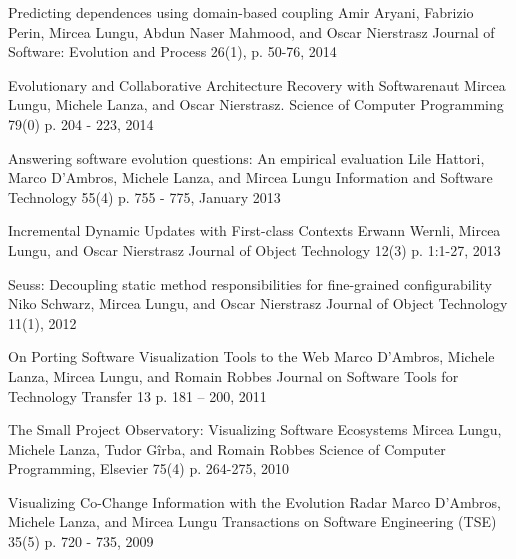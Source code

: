 
\begin{enumerate}

\paper
	{Predicting dependences using domain-based coupling}
	{Amir Aryani, Fabrizio Perin, Mircea Lungu, Abdun Naser Mahmood, and Oscar Nierstrasz}
	{Journal of Software: Evolution and Process 26(1), p. 50-76, 2014}

\paper 
	{Evolutionary and Collaborative Architecture Recovery with Softwarenaut}
	{Mircea Lungu, Michele Lanza, and Oscar Nierstrasz.}
	{Science of Computer Programming 79(0) p. 204 - 223, 2014}

\paper 
	{Answering software evolution questions: An empirical evaluation}
	{Lile Hattori, Marco D'Ambros, Michele Lanza, and Mircea Lungu}
	{Information and Software Technology 55(4) p. 755 - 775, January 2013}

\paper 
	{Incremental Dynamic Updates with First-class Contexts}
	{Erwann Wernli, Mircea Lungu, and Oscar Nierstrasz}
	{Journal of Object Technology 12(3) p. 1:1-27, 2013}

\paper
	{Seuss: Decoupling  static method responsibilities for fine-grained configurability}
	{Niko Schwarz, Mircea Lungu, and Oscar Nierstrasz}
	{Journal of Object Technology 11(1), 2012}

\paper 
	{On Porting Software Visualization Tools to the Web}
	{Marco D'Ambros, Michele Lanza, Mircea Lungu, and Romain Robbes}
	{Journal on Software Tools for Technology Transfer 13 p. 181 -- 200, 2011}

\paper 
	{The Small Project Observatory: Visualizing Software Ecosystems}
	{Mircea Lungu, Michele Lanza, Tudor G\^irba, and Romain Robbes}
	{Science of Computer Programming, Elsevier 75(4) p. 264-275, 2010}

\paper 
	{Visualizing Co-Change Information with the Evolution Radar}
	{Marco D'Ambros, Michele Lanza, and Mircea Lungu}
	{Transactions on Software Engineering (TSE) 35(5) p. 720 - 735, 2009}

\end{enumerate}




